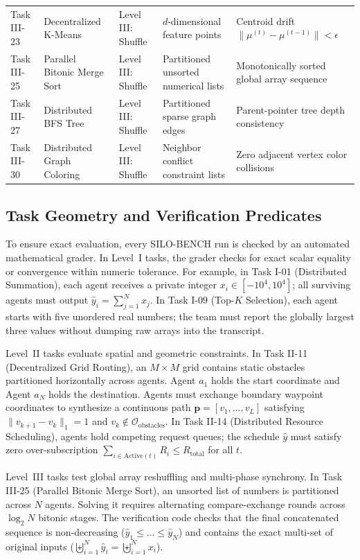 \documentclass{ieeeaccess}
\begin{document}
\begin{table}[t]
{\begin{tabular}{lllll}
Task III-23 & Decentralized K-Means & Level III: Shuffle & $d$-dimensional feature points & Centroid drift $\|\mu^{(t)} - \mu^{(t-1)}\| < \epsilon$ \\
Task III-25 & Parallel Bitonic Merge Sort & Level III: Shuffle & Partitioned unsorted numerical lists & Monotonically sorted global array sequence \\
Task III-27 & Distributed BFS Tree & Level III: Shuffle & Partitioned sparse graph edges & Parent-pointer tree depth consistency \\
Task III-30 & Distributed Graph Coloring & Level III: Shuffle & Neighbor conflict constraint lists & Zero adjacent vertex color collisions \\
\bottomrule
\end{tabular}%
}
\end{table}

\subsection{Task Geometry and Verification Predicates}
To ensure exact evaluation, every SILO-BENCH run is checked by an automated mathematical grader. In Level~I tasks, the grader checks for exact scalar equality or convergence within numeric tolerance. For example, in Task I-01 (Distributed Summation), each agent receives a private integer $x_i \in [-10^4, 10^4]$; all surviving agents must output $\hat{y}_i = \sum_{j=1}^N x_j$. In Task I-09 (Top-$K$ Selection), each agent starts with five unordered real numbers; the team must report the globally largest three values without dumping raw arrays into the transcript.

Level~II tasks evaluate spatial and geometric constraints. In Task II-11 (Decentralized Grid Routing), an $M \times M$ grid contains static obstacles partitioned horizontally across agents. Agent $a_1$ holds the start coordinate and Agent $a_N$ holds the destination. Agents must exchange boundary waypoint coordinates to synthesize a continuous path $\mathbf{p} = [v_1, \dots, v_L]$ satisfying $\|v_{k+1} - v_k\|_1 = 1$ and $v_k \notin \mathcal{O}_{\text{obstacles}}$. In Task II-14 (Distributed Resource Scheduling), agents hold competing request queues; the schedule $\hat{y}$ must satisfy zero over-subscription $\sum_{i \in \text{Active}(t)} R_i \le R_{\text{total}}$ for all $t$.

Level~III tasks test global array reshuffling and multi-phase synchrony. In Task III-25 (Parallel Bitonic Merge Sort), an unsorted list of numbers is partitioned across $N$ agents. Solving it requires alternating compare-exchange rounds across $\log_2 N$ bitonic stages. The verification code checks that the final concatenated sequence is non-decreasing ($\hat{y}_1 \le \dots \le \hat{y}_N$) and contains the exact multi-set of original inputs ($\biguplus_{i=1}^N \hat{y}_i = \biguplus_{i=1}^N x_i$).
\end{document}
